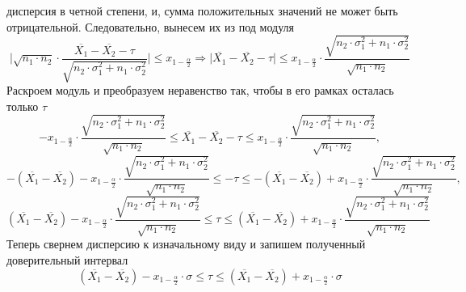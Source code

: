 \documentclass[a4paper, 12pt]{article}
\begin{document}
    дисперсия в четной степени, и, сумма положительных значений не может быть отрицательной. Следовательно, вынесем их из под модуля
    $$\Bigg|\sqrt{n_1\cdot n_2}\cdot\dfrac{\overline{X_1}-\overline{X_2}-\tau}{\sqrt{n_2\cdot\sigma_1^2+n_1\cdot\sigma_2^2}}\Bigg|\leq x_{1-\frac{\alpha}{2}}\Rightarrow
    \Bigg|\overline{X_1}-\overline{X_2}-\tau\Bigg|\leq x_{1-\frac{\alpha}{2}}\cdot\dfrac{\sqrt{n_2\cdot\sigma_1^2+n_1\cdot\sigma_2^2}}{\sqrt{n_1\cdot n_2}}$$
    Раскроем модуль и преобразуем неравенство так, чтобы в его рамках осталась только $\tau$
    $$-x_{1-\frac{\alpha}{2}}\cdot\dfrac{\sqrt{n_2\cdot\sigma_1^2+n_1\cdot\sigma_2^2}}{\sqrt{n_1\cdot n_2}}\leq\overline{X_1}-\overline{X_2}-\tau\leq x_{1-\frac{\alpha}{2}}\cdot\dfrac{\sqrt{n_2\cdot\sigma_1^2+n_1\cdot\sigma_2^2}}{\sqrt{n_1\cdot n_2}},$$
    $$-\left(\overline{X_1}-\overline{X_2}\right)-x_{1-\frac{\alpha}{2}}\cdot\dfrac{\sqrt{n_2\cdot\sigma_1^2+n_1\cdot\sigma_2^2}}{\sqrt{n_1\cdot n_2}}\leq-\tau\leq -\left(\overline{X_1}-\overline{X_2}\right)+x_{1-\frac{\alpha}{2}}\cdot\dfrac{\sqrt{n_2\cdot\sigma_1^2+n_1\cdot\sigma_2^2}}{\sqrt{n_1\cdot n_2}},$$
    $$\left(\overline{X_1}-\overline{X_2}\right)-x_{1-\frac{\alpha}{2}}\cdot\dfrac{\sqrt{n_2\cdot\sigma_1^2+n_1\cdot\sigma_2^2}}{\sqrt{n_1\cdot n_2}}\leq\tau\leq \left(\overline{X_1}-\overline{X_2}\right)+x_{1-\frac{\alpha}{2}}\cdot\dfrac{\sqrt{n_2\cdot\sigma_1^2+n_1\cdot\sigma_2^2}}{\sqrt{n_1\cdot n_2}}$$
    Теперь свернем дисперсию к изначальному виду и запишем полученный доверительный интервал
    $$\left(\overline{X_1}-\overline{X_2}\right)-x_{1-\frac{\alpha}{2}}\cdot\sigma\leq\tau\leq \left(\overline{X_1}-\overline{X_2}\right)+x_{1-\frac{\alpha}{2}}\cdot\sigma$$
\end{document}
